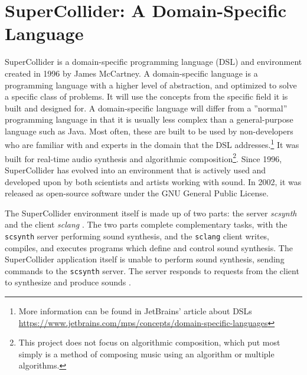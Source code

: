 \section[SuperCollider: A Domain-Specific Language]{SuperCollider: A Domain-Specific Language}\label{supercollider}

SuperCollider is a domain-specific programming language (DSL) and environment created in 1996 by James McCartney. A domain-specific language is a programming language with a higher level of abstraction, and optimized to solve a specific class of problems. It will use the concepts from the specific field it is built and designed for. A domain-specific language will differ from a ''normal'' programming language in that it is usually less complex than a general-purpose language such as Java. Most often, these are built to be used by non-developers who are familiar with and experts in the domain that the DSL addresses.\footnote{More information can be found in JetBrains' article about DSLs  \url{https://www.jetbrains.com/mps/concepts/domain-specific-languages}} It was built for real-time audio synthesis and algorithmic composition\footnote{This project does not focus on algorithmic composition, which put most simply is a method of composing music using an algorithm or multiple algorithms.}. Since 1996, SuperCollider has evolved into an environment that is actively used and developed upon by both scientists and artists working with sound. In 2002, it was released as open-source software under the GNU General Public License.

The SuperCollider environment itself is made up of two parts: the server \textit{scsynth} and the client \textit{sclang} \cite{McCartney_2002}. The two parts complete complementary tasks, with the \texttt{scsynth} server performing sound synthesis, and the \texttt{sclang} client writes, compiles, and executes programs which define and control sound synthesis. The SuperCollider application itself is unable to perform sound synthesis, sending commands to the \texttt{scsynth} server. The server responds to requests from the client to synthesize and produce sounds \cite{McCartney_2021}. 